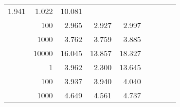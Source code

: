 \begin{table}
\begin{tabular}{rrrrrrrrr}
						
							    
							    
	                           1.941 & 1.022 & 10.081  \\
	                
	            
					 &  
					 
					\multirow{ 1 }{*}{ 100 } &
					
						
							    
							    
	                           2.965 & 2.927 & 2.997  \\
	                
	            
					 &  
					 
					\multirow{ 1 }{*}{ 1000 } &
					
						
							    
							    
	                           3.762 & 3.759 & 3.885  \\
	                
	            
					 &  
					 
					\multirow{ 1 }{*}{ 10000 } &
					
						
							    
							    
	                           16.045 & 13.857 & 18.327  \\
	                
	            
	        
				\noalign{\smallskip}\hline
				\multirow{ 4 }{*}{ 1000000 } &
				
					
					 
					\multirow{ 1 }{*}{ 1 } &
					
						
							    
							    
	                           3.962 & 2.300 & 13.645  \\
	                
	            
					 &  
					 
					\multirow{ 1 }{*}{ 100 } &
					
						
							    
							    
	                           3.937 & 3.940 & 4.040  \\
	                
	            
					 &  
					 
					\multirow{ 1 }{*}{ 1000 } &
					
						
							    
							    
	                           4.649 & 4.561 & 4.737  \\
	                

\end{tabular}
\end{table}
